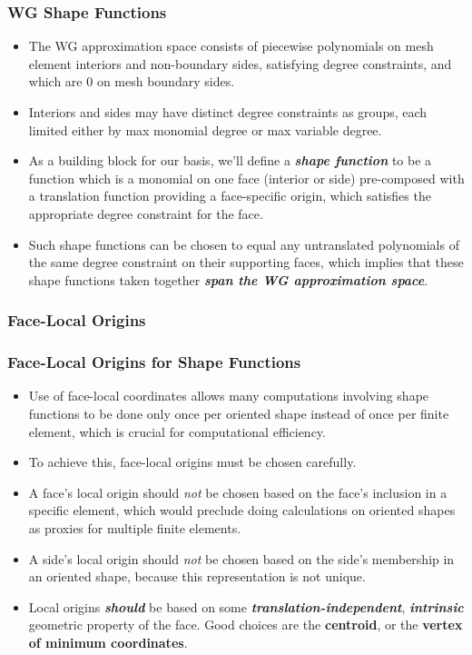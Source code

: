 \documentclass[compress]{beamer}
\begin{document}
\begin{frame}
  \frametitle{WG Shape Functions}
  \begin{itemize}[<+->]
    \item The WG approximation space consists of piecewise polynomials on mesh element interiors and non-boundary sides,
      satisfying degree constraints, and which are 0 on mesh boundary sides.
    \item Interiors and sides may have distinct degree constraints as groups, each limited either by max monomial degree or max variable degree.
    \item As a building block for our basis, we'll define a \emph{\textbf{shape function}} to be a function which is a monomial on one face
      (interior or side) pre-composed with a translation function providing a face-specific origin, which satisfies the appropriate
      degree constraint for the face.
    \item Such shape functions can be chosen to equal any untranslated polynomials of the same degree constraint on their supporting faces,
      which implies that these shape functions taken together \emph{\textbf{span the WG approximation space}}. 
  \end{itemize}
\end{frame}


\subsubsection{Face-Local Origins}

\begin{frame}
  \frametitle{Face-Local Origins for Shape Functions}
  \begin{itemize}[<+->]
    \item Use of face-local coordinates allows many computations involving shape functions to be done only once per oriented shape
      instead of once per finite element, which is crucial for computational efficiency.
    \item To achieve this, face-local origins must be chosen carefully.
    \item A face's local origin should \emph{not} be chosen based on the face's inclusion in a specific element, which would preclude doing
          calculations on oriented shapes as proxies for multiple finite elements.
    \item A side's local origin should \emph{not} be chosen based on the side's membership in an oriented shape, because this representation
      is not unique.
    \item Local origins \emph{\textbf{should}} be based on some \emph{\textbf{translation-independent}}, \emph{\textbf{intrinsic}} geometric
      property of the face. Good choices are the \textbf{centroid}, or the \textbf{vertex of minimum coordinates}.
  \end{itemize}
\end{frame}
\end{document}
